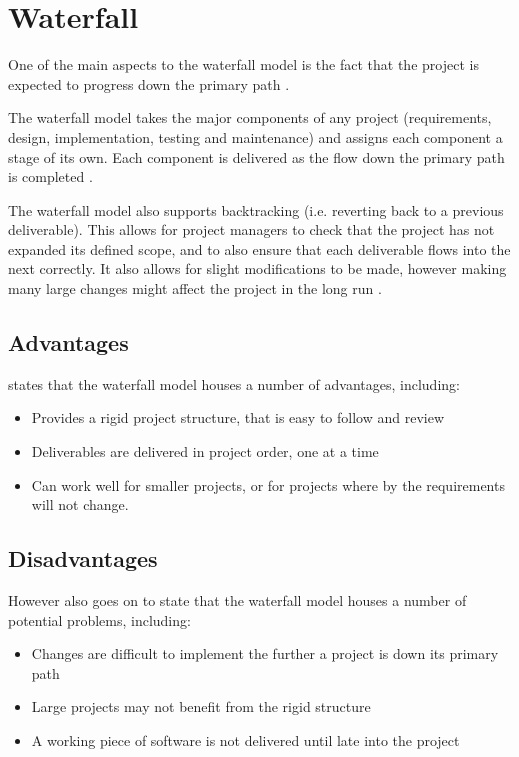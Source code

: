 \section{Waterfall}

One of the main aspects to the waterfall model is the fact that the project is 
expected to progress down the primary path \citep{cadle10}.

The waterfall model takes the major components of any project (requirements, 
design, implementation, testing and maintenance) and assigns each component a 
stage of its own. Each component is delivered as the flow down the primary path
is completed \citep{cadle10}.

The waterfall model also supports backtracking (i.e. reverting back to a 
previous deliverable). This allows for project managers to check that the 
project has not expanded its defined scope, and to also ensure that each 
deliverable flows into the next correctly. It also allows for slight 
modifications to be made, however making many large changes might affect the 
project in the long run \citep{cadle10}.


\subsection{Advantages}
\citet{cadle10} states that the waterfall model houses a number of advantages, 
including:

\begin{itemize}
  \item Provides a rigid project structure, that is easy to follow and review
  \item Deliverables are delivered in project order, one at a time
  \item Can work well for smaller projects, or for projects where by the 
  requirements will not change. 
\end{itemize}


\subsection{Disadvantages}
However \citet{cadle10} also goes on to state that the waterfall model houses a
number of potential problems, including:

\begin{itemize}
  \item Changes are difficult to implement the further a project is down its 
  primary path
  \item Large projects may not benefit from the rigid structure
  \item A working piece of software is not delivered until late into the 
  project
\end{itemize}
